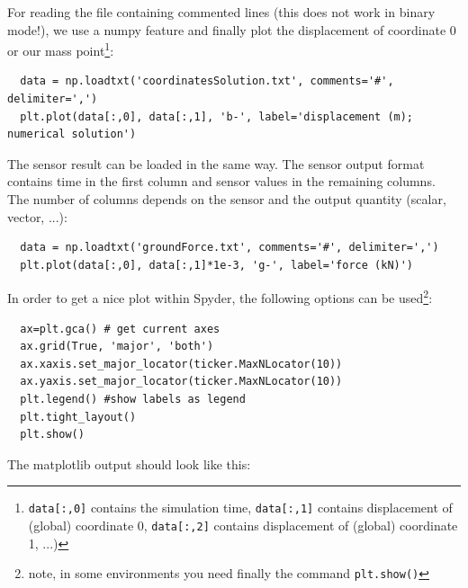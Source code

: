 For reading the file containing commented lines (this does not work in binary mode!), we use a numpy feature and finally plot the displacement of coordinate 0 or our mass point\footnote{\texttt{data[:,0]} contains the simulation time, \texttt{data[:,1]} contains displacement of (global) coordinate 0, \texttt{data[:,2]} contains displacement of (global) coordinate 1, ...)}:
\pythonstyle\begin{lstlisting}
  data = np.loadtxt('coordinatesSolution.txt', comments='#', delimiter=',')
  plt.plot(data[:,0], data[:,1], 'b-', label='displacement (m); numerical solution') 
\end{lstlisting}
The sensor result can be loaded in the same way. The sensor output format contains time in the first column and sensor values in the remaining columns. The number of columns depends on the 
sensor and the output quantity (scalar, vector, ...):
\pythonstyle\begin{lstlisting}
  data = np.loadtxt('groundForce.txt', comments='#', delimiter=',')
  plt.plot(data[:,0], data[:,1]*1e-3, 'g-', label='force (kN)')
\end{lstlisting}
%
In order to get a nice plot within Spyder, the following options can be used\footnote{note, in some environments you need finally the command \texttt{plt.show()}}:
\pythonstyle\begin{lstlisting}
  ax=plt.gca() # get current axes
  ax.grid(True, 'major', 'both')
  ax.xaxis.set_major_locator(ticker.MaxNLocator(10))
  ax.yaxis.set_major_locator(ticker.MaxNLocator(10))
  plt.legend() #show labels as legend
  plt.tight_layout()
  plt.show() 
\end{lstlisting}
%
The matplotlib output should look like this:
%



